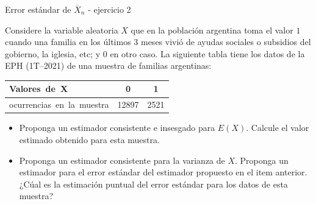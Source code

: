 \documentclass{beamer}
\theoremstyle{definition}
\begin{document}
\begin{frame}{\color{rosee}Error est\'andar de $\overline{X}_n$ - ejercicio 2}\small
  
Considere la variable aleatoria $X$ que en la población argentina toma el valor $1$ cuando una familia en los últimos 3 meses vivió de ayudas sociales o subsidios del gobierno, la iglesia, etc; y $0$ en otro caso. La siguiente tabla tiene los datos de la EPH (1T--2021) de una muestra de familias argentinas:%
    \begin{table}
      \centering
      \begin{tabular}{|l|cc|}
        \hline
        \mbox{Valores de X }&0&1\\
        \hline
        \mbox{ocurrencias en la muestra}&12897 & 2521\\
        \hline
      \end{tabular}
    \end{table}
    \begin{itemize}
    \item Proponga un estimador consistente e insesgado para
      $E(X)$. Calcule el valor estimado obtenido para esta muestra.
    \item Proponga un estimador consistente para la varianza
      de $X$. Proponga un estimador para el error est\'andar del
      estimador propuesto en el item anterior. ¿C\'ual es la estimación puntual del error
      est\'andar para los datos de esta muestra?
    \end{itemize}
  
\end{frame}
\end{document}
